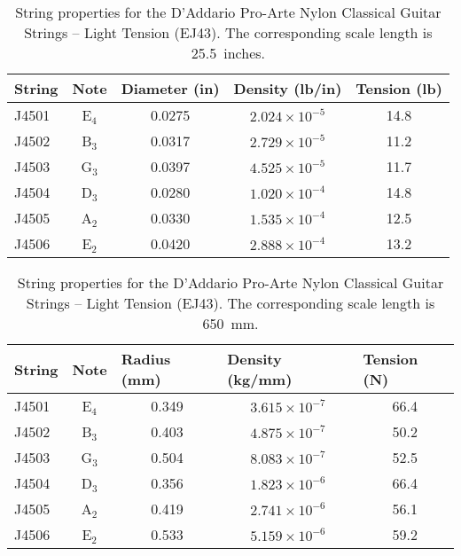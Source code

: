 \begin{table}[htbp]
  \centering
  \caption{\label{tbl:ej43_ips} String properties for the D'Addario Pro-Arte Nylon Classical Guitar Strings -- Light Tension (EJ43). The corresponding scale length is 25.5~inches.}
    \begin{tabular}{lcccc}
    \hline \hline
    String  & Note  & \multicolumn{1}{l}{Diameter (in)} & \multicolumn{1}{l}{Density (lb/in)} & \multicolumn{1}{l}{Tension (lb)} \\
    \hline
    J4501 & E$_4$  & 0.0275 & $2.024 \times 10^{-5}$ & 14.8 \\
    J4502 & B$_3$  & 0.0317 & $2.729 \times 10^{-5}$ & 11.2 \\
    J4503 & G$_3$  & 0.0397 & $4.525 \times 10^{-5}$ & 11.7 \\
    J4504 & D$_3$  & 0.0280 & $1.020 \times 10^{-4}$ & 14.8 \\
    J4505 & A$_2$  & 0.0330 & $1.535 \times 10^{-4}$ & 12.5 \\
    J4506 & E$_2$  & 0.0420 & $2.888 \times 10^{-4}$ & 13.2 \\
    \hline
    \end{tabular}%
  \label{tab:addlabel}%
\end{table}%

\begin{table}[htbp]
  \centering
  \caption{\label{tbl:ej43_mks} String properties for the D'Addario Pro-Arte Nylon Classical Guitar Strings -- Light Tension (EJ43). The corresponding scale length is 650~mm.}
    \begin{tabular}{lcccc}
    \hline \hline
    String  & Note  & \multicolumn{1}{l}{Radius (mm)} & \multicolumn{1}{l}{Density (kg/mm)} & \multicolumn{1}{l}{Tension (N)} \\
    \hline
    J4501 & E$_4$  & 0.349 & $3.615 \times 10^{-7}$ & 66.4 \\
    J4502 & B$_3$  & 0.403 & $4.875 \times 10^{-7}$ & 50.2 \\
    J4503 & G$_3$  & 0.504 & $8.083 \times 10^{-7}$ & 52.5 \\
    J4504 & D$_3$  & 0.356 & $1.823 \times 10^{-6}$ & 66.4 \\
    J4505 & A$_2$  & 0.419 & $2.741 \times 10^{-6}$ & 56.1 \\
    J4506 & E$_2$  & 0.533 & $5.159 \times 10^{-6}$ & 59.2 \\
    \hline
    \end{tabular}%
  \label{tab:addlabel}%
\end{table}%


